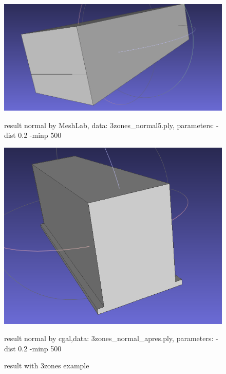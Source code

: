 \documentclass{article}
\begin{document}
\begin{figure}[H]
  \begin{minipage}[t]{0.35\textwidth}
    \includegraphics[width=\textwidth]{../../images/screen_kinetic/3zones_result_normal5_cgal.png}
    \caption*{result normal by MeshLab,\newline
    data: 3zones\_normal5.ply,\newline
    parameters: -dist 0.2 \newline-minp 500}
  \end{minipage}
  \hspace{0.05\textwidth}
  \begin{minipage}[t]{0.29\textwidth}
    \includegraphics[width=\textwidth]{../../images/screen_kinetic/3zones_result_normal_cgal.png}
    \caption*{result normal by cgal,\newline data: 3zones\_normal\_apres.ply,\newline
    parameters: -dist 0.2 \newline-minp 500}
  \end{minipage}
  \caption{result with 3zones example}
\end{figure}  
\end{document}
